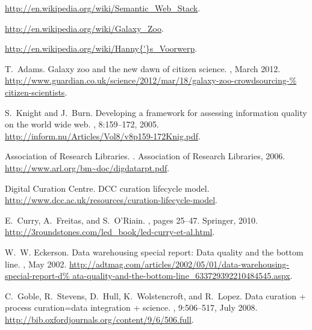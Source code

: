 \documentclass{acm_proc_article-sp}
\begin{document}
%
% 

\begin{thebibliography}{10}

\url{http://en.wikipedia.org/wiki/Semantic_Web_Stack}.

\url{http://en.wikipedia.org/wiki/Galaxy_Zoo}.

\url{http://en.wikipedia.org/wiki/Hanny{'}s_Voorwerp}.

T.~Adams.
\newblock Galaxy zoo and the new dawn of citizen science.
, March 2012.
\newblock
  \url{http://www.guardian.co.uk/science/2012/mar/18/galaxy-zoo-crowdsourcing-%
citizen-scientists}.

S.~Knight and J.~Burn.
\newblock Developing a framework for assessing information quality on the world
  wide web.
, 8:159--172, 2005.
\newblock \url{http://inform.nu/Articles/Vol8/v8p159-172Knig.pdf}.

Association of Research Libraries.
. Association of Research Libraries, 2006.
\newblock \url{http://www.arl.org/bm~doc/digdatarpt.pdf}.

Digital Curation Centre.
\newblock DCC curation lifecycle model.
\newblock \url{http://www.dcc.ac.uk/resources/curation-lifecycle-model}.

E.~Curry, A.~Freitas, and S.~O'Riain.
,
  pages 25--47.
\newblock Springer, 2010.
\newblock \url{http://3roundstones.com/led_book/led-curry-et-al.html}.

W.~W. Eckerson.
\newblock Data warehousing special report: Data quality and the bottom line.
, May 2002.
\newblock
  \url{http://adtmag.com/articles/2002/05/01/data-warehousing-special-report-d%
ata-quality-and-the-bottom-line_633729392210484545.aspx}.

C.~Goble, R.~Stevens, D.~Hull, K.~Wolstencroft, and R.~Lopez.
\newblock Data curation + process curation=data integration + science.
, 9:506--517, July 2008.
\newblock \url{http://bib.oxfordjournals.org/content/9/6/506.full}.


\end{thebibliography}
\end{document}
